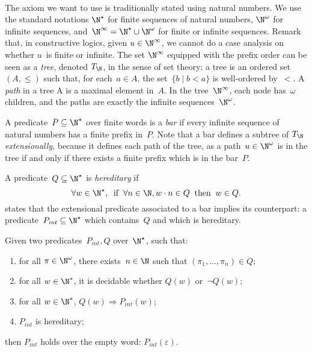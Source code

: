 \paragraph{\Barinduction}
The axiom we want to use is traditionally stated using natural numbers.
%
We use the standard notations $\N^\star$ for finite sequences of natural numbers,
$\N^\omega$ for infinite sequences, and~$\N^\infty = \N^\star \cup \N^\omega$ for
finite or infinite sequences.
%
Remark that, in constructive logics, given $u \in \N^\infty$, we cannot do a
case analysis on whether $u$~is finite or infinite.
%
The set $\N^\infty$ equipped with the prefix order can be seen as a \emph{tree},
denoted $\utree$, in the sense of set theory: a tree is an ordered set~$(A,
\leq)$ such that, for each~$a \in A$, the set~$\{ b \mid b < a \}$ is
well-ordered by~$<$. A \emph{path} in a tree A is a maximal element in~$A$.
%
In the tree~$\N^\infty$, each node has~$\omega$ children, and the paths are
exactly the infinite sequences~$\N^\omega$.

A predicate~$P \subseteq \N^\star$ over finite words is a {\em bar} if every
infinite sequence of natural numbers has a finite prefix in~$P$. Note that a bar
defines a subtree of $\utree$ \emph{extensionally}, because it defines each path
of the tree, as a path~$u \in \N^\omega$ is in the tree if and only if there exists a finite
prefix which is in the bar~$P$.

A predicate~$Q \subseteq \N^\star$ is {\em hereditary} if
\[
  \forall w \in \N^\star, \;\;
  \text{if}\;\;
  \forall n \in \N, w \cdot n \in Q
  \;\;\text{then}\;\;
  w \in Q.
\]
%
\Barinduction states that the extensional predicate associated to a bar implies its \emph{\intentional} counterpart:
a predicate~$P_{\mathit{int}} \subseteq \N^\star$ which contains~$Q$ and which is
hereditary.


\renewcommand{\bar}{Q}
\newcommand{\pint}{P_{\mathit{int}}}


\begin{myaxiom} %
  Given two predicates~$\pint, \bar$ over~$\N^\star$, such that:
  \begin{enumerate}
    \item for all $\pi \in \N^\omega$, there exists~$n \in
      \N$ such that $(\pi_1, \dots, \pi_n) \in \bar$;
    \item for all $w \in \N^\ast$, it is decidable whether $\bar(w)$ or~$\neg \bar(w)$;
    \item for all $w \in \N^\ast$, $\bar(w) \Rightarrow \pint(w)$;
    \item $\pint$ is hereditary;
  \end{enumerate}
  then $\pint$ holds over the empty word: $\pint(\varepsilon)$.
\end{myaxiom}

